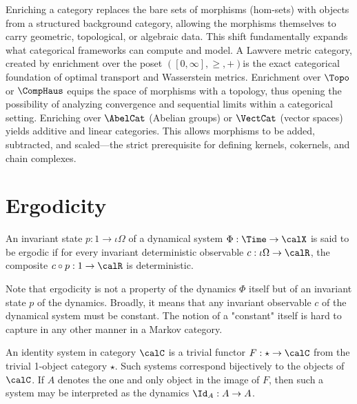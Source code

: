 \documentclass[12pt,oneside,pb-diagram]{article}
\begin{document}
Enriching a category replaces the bare sets of morphisms (hom-sets) with objects from a structured background category, allowing the morphisms themselves to carry geometric, topological, or algebraic data. This shift fundamentally expands what categorical frameworks can compute and model. A Lawvere metric category, created by enrichment over the poset $([0, \infty], \geq, +)$is the exact categorical foundation of optimal transport and Wasserstein metrics. Enrichment over $\Topo$ or $\CompHaus$ equips the space of morphisms with a topology, thus opening the possibility of analyzing convergence and sequential limits within a categorical setting. Enriching over $\AbelCat$ (Abelian groups) or $\VectCat$ (vector spaces) yields additive and linear categories. This allows morphisms to be added, subtracted, and scaled—the strict prerequisite for defining kernels, cokernels, and chain complexes. 

\section{Ergodicity} \label{sec:erg}

\begin{definition} [Ergodicity]
	\cite[Def 3.8]{MossPerrone2022ergdc} An invariant state $p:1\to \iota \Omega$ of a dynamical system $\Phi:\Time \to \calX$ is said to be ergodic if for every invariant deterministic observable $c:\iota \Omega \to \calR$, the composite $c\circ p : 1\to \calR$ is deterministic.
\end{definition}

Note that ergodicity is not a property of the dynamics $\Phi$ itself but of an invariant state $p$ of the dynamics. Broadly, it means that any invariant observable $c$ of the dynamical system must be constant. The notion of a "constant" itself is hard to capture in any other manner in a Markov category.

\begin{definition} 
	An identity system in category $\calC$ is a trivial functor $F : \star \to \calC$ from the trivial 1-object category $\star$. Such systems correspond bijectively to the objects of $\calC$. If $A$ denotes the one and only object in the image of $F$, then such a system may be interpreted as the dynamics $\Id_A : A \to A$.
\end{definition}
\end{document}
